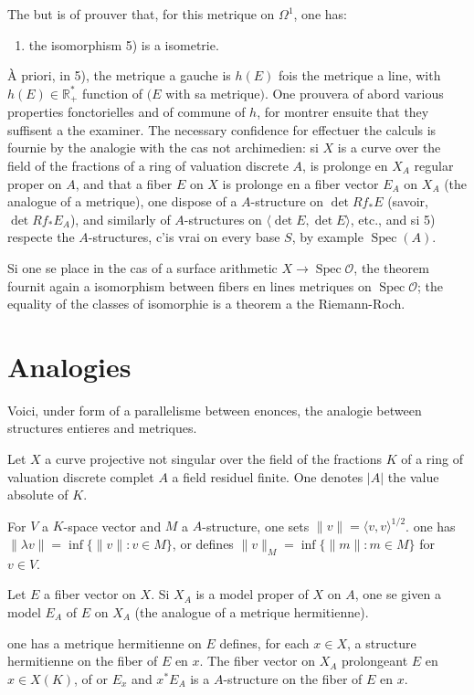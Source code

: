 \documentclass[11pt,a4paper]{article}
\theoremstyle{plain}
\theoremstyle{definition}
\DeclareMathOperator{\Spec}{Spec}
\newcommand{\R}{\mathbb{R}}
\newcommand{\cO}{\mathcal{O}}
\begin{document}
The but is of prouver that, for this metrique on $\Omega^1$, one has:
\begin{enumerate}
\item[8)] the isomorphism 5) is a isometrie.
\end{enumerate}

\`A priori, in 5), the metrique a gauche is $h(E)$ fois the metrique a line, with $h(E) \in \R_+^*$ function of $(E$ with sa metrique$)$. One prouvera of abord various properties fonctorielles and of commune of $h$, for montrer ensuite that they suffisent a the examiner. The necessary confidence for effectuer the calculs is fournie by the analogie with the cas not archimedien: si $X$ is a curve over the field of the fractions of a ring of valuation discrete $A$, is prolonge en $X_A$ regular proper on $A$, and that a fiber $E$ on $X$ is prolonge en a fiber vector $E_A$ on $X_A$ (the analogue of a metrique), one dispose of a $A$-structure on $\det Rf_* E$ (savoir, $\det Rf_* E_A$), and similarly of $A$-structures on $\langle \det E, \det E \rangle$, etc., and si 5) respecte the $A$-structures, c'is vrai on every base $S$, by example $\Spec(A)$.

Si one se place in the cas of a surface arithmetic $X \to \Spec \cO$, the theorem fournit again a isomorphism between fibers en lines metriques on $\Spec \cO$; the equality of the classes of isomorphie is a theorem a the Riemann-Roch.

\section{Analogies}

Voici, under form of a parallelisme between enonces, the analogie between structures entieres and metriques.

Let $X$ a curve projective not singular over the field of the fractions $K$ of a ring of valuation discrete complet $A$ a field residuel finite. One denotes $|A|$ the value absolute of $K$.

For $V$ a $K$-space vector and $M$ a $A$-structure, one sets $\|v\| = \langle v, v \rangle^{1/2}$. one has $\|\lambda v\| = \inf\{\|v\| : v \in M\}$, or defines $\|v\|_M = \inf\{\|m\| : m \in M\}$ for $v \in V$.

Let $E$ a fiber vector on $X$. Si $X_A$ is a model proper of $X$ on $A$, one se given a model $E_A$ of $E$ on $X_A$ (the analogue of a metrique hermitienne).

\medskip

one has a metrique hermitienne on $E$ defines, for each $x \in X$, a structure hermitienne on the fiber of $E$ en $x$. The fiber vector on $X_A$ prolongeant $E$ en $x \in X(K)$, of or $E_x$ and $x^* E_A$ is a $A$-structure on the fiber of $E$ en $x$.
\end{document}
